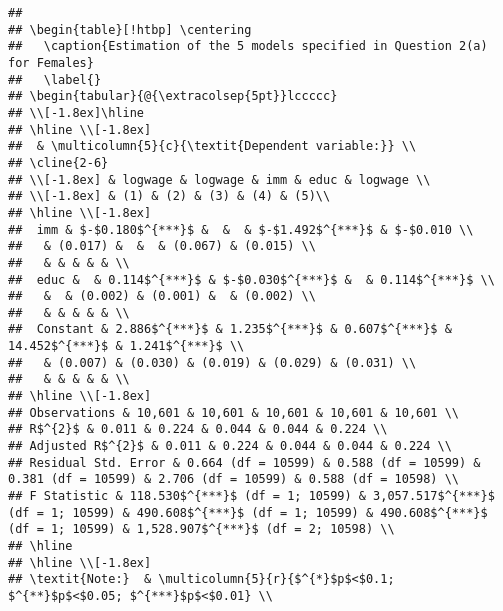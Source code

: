 \documentclass[]{article}
\begin{document}
\begin{verbatim}
## 
## \begin{table}[!htbp] \centering 
##   \caption{Estimation of the 5 models specified in Question 2(a) for Females} 
##   \label{} 
## \begin{tabular}{@{\extracolsep{5pt}}lccccc} 
## \\[-1.8ex]\hline 
## \hline \\[-1.8ex] 
##  & \multicolumn{5}{c}{\textit{Dependent variable:}} \\ 
## \cline{2-6} 
## \\[-1.8ex] & logwage & logwage & imm & educ & logwage \\ 
## \\[-1.8ex] & (1) & (2) & (3) & (4) & (5)\\ 
## \hline \\[-1.8ex] 
##  imm & $-$0.180$^{***}$ &  &  & $-$1.492$^{***}$ & $-$0.010 \\ 
##   & (0.017) &  &  & (0.067) & (0.015) \\ 
##   & & & & & \\ 
##  educ &  & 0.114$^{***}$ & $-$0.030$^{***}$ &  & 0.114$^{***}$ \\ 
##   &  & (0.002) & (0.001) &  & (0.002) \\ 
##   & & & & & \\ 
##  Constant & 2.886$^{***}$ & 1.235$^{***}$ & 0.607$^{***}$ & 14.452$^{***}$ & 1.241$^{***}$ \\ 
##   & (0.007) & (0.030) & (0.019) & (0.029) & (0.031) \\ 
##   & & & & & \\ 
## \hline \\[-1.8ex] 
## Observations & 10,601 & 10,601 & 10,601 & 10,601 & 10,601 \\ 
## R$^{2}$ & 0.011 & 0.224 & 0.044 & 0.044 & 0.224 \\ 
## Adjusted R$^{2}$ & 0.011 & 0.224 & 0.044 & 0.044 & 0.224 \\ 
## Residual Std. Error & 0.664 (df = 10599) & 0.588 (df = 10599) & 0.381 (df = 10599) & 2.706 (df = 10599) & 0.588 (df = 10598) \\ 
## F Statistic & 118.530$^{***}$ (df = 1; 10599) & 3,057.517$^{***}$ (df = 1; 10599) & 490.608$^{***}$ (df = 1; 10599) & 490.608$^{***}$ (df = 1; 10599) & 1,528.907$^{***}$ (df = 2; 10598) \\ 
## \hline 
## \hline \\[-1.8ex] 
## \textit{Note:}  & \multicolumn{5}{r}{$^{*}$p$<$0.1; $^{**}$p$<$0.05; $^{***}$p$<$0.01} \\ 

\end{verbatim}
\end{document}
